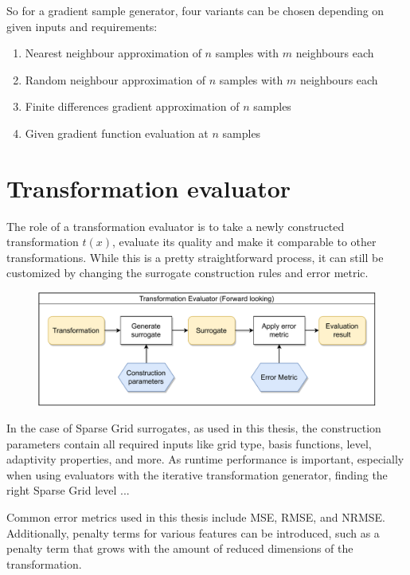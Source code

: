\documentclass[
  a4paper,  %
  twoside,  %
  bibliography=totoc,
  headsepline,
  cleardoublepage=empty,
  parskip=half,
  draft=false
]{scrbook}
\begin{document}
So for a gradient sample generator, four variants can be chosen depending on given inputs and requirements:
\begin{enumerate}
\item Nearest neighbour approximation of $n$ samples with $m$ neighbours each
\item Random neighbour approximation of $n$ samples with $m$ neighbours each
\item Finite differences gradient approximation of $n$ samples
\item Given gradient function evaluation at $n$ samples
\end{enumerate}




\section {Transformation evaluator}

The role of a transformation evaluator is to take a newly constructed transformation $t(x)$, evaluate its quality and make it comparable to other transformations.
While this is a pretty straightforward process, it can still be customized by changing the surrogate construction rules and error metric.

\begin{figure}[H]
\begin{center}
	\includegraphics[width=\textwidth]{graphics/TransformationEval.pdf}
\end{center}
\end{figure}

In the case of Sparse Grid surrogates, as used in this thesis, the construction parameters contain all required inputs like grid type, basis functions, level, adaptivity properties, and more.
As runtime performance is important, especially when using evaluators with the iterative transformation generator, finding the right Sparse Grid level ...

Common error metrics used in this thesis include MSE, RMSE, and NRMSE.
Additionally, penalty terms for various features can be introduced, such as a penalty term that grows with the amount of reduced dimensions of the transformation.
\end{document}
